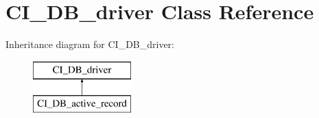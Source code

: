 \hypertarget{class_c_i___d_b__driver}{\section{C\-I\-\_\-\-D\-B\-\_\-driver Class Reference}
\label{class_c_i___d_b__driver}
}
Inheritance diagram for C\-I\-\_\-\-D\-B\-\_\-driver\-:\begin{figure}[H]
\begin{center}
\leavevmode
\includegraphics[height=2.000000cm]{class_c_i___d_b__driver}
\end{center}
\end{figure}

